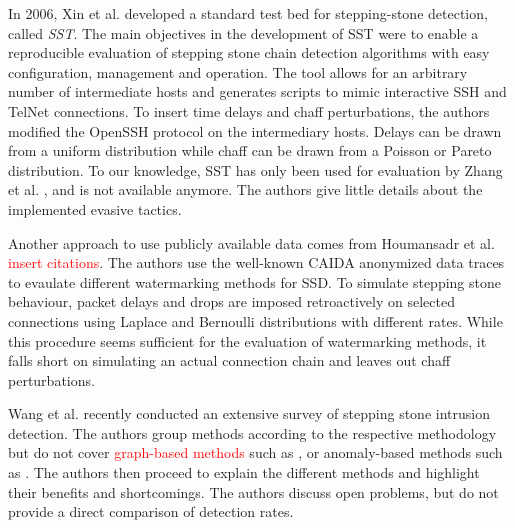 \documentclass[runningheads]{llncs}\usepackage[]{graphicx}\usepackage[]{color}
\begin{document}
In 2006, Xin et al. \cite{xin2006testbed} developed a standard test bed for stepping-stone detection, called \textit{SST}. 
The main objectives in the development of SST were to enable a reproducible evaluation of stepping stone chain detection algorithms with easy configuration, management and operation. The tool allows for an arbitrary number of intermediate hosts and generates scripts to mimic interactive SSH and TelNet connections. 
To insert time delays and chaff perturbations, the authors modified the OpenSSH protocol on the intermediary hosts. Delays can be drawn from a uniform distribution while chaff can be drawn from a Poisson or Pareto distribution. To our knowledge, SST has only been used for evaluation by Zhang et al. \cite{zhang2005stepping}, and is not available anymore. The authors give little details about the implemented evasive tactics.%

Another approach to use publicly available data comes from Houmansadr et al. \textcolor{red}{insert citations}. The authors use the well-known CAIDA anonymized data traces \cite{CAIDA2018} to evaulate different watermarking methods for SSD. To simulate stepping stone behaviour, packet delays and drops are imposed retroactively on selected connections using Laplace and Bernoulli distributions with different rates. While this procedure seems sufficient for the evaluation of watermarking methods, it falls short on simulating an actual connection chain and leaves out chaff perturbations. 


Wang et al. \cite{wang2018research} recently conducted an extensive survey of  stepping stone intrusion detection. The authors group methods according to the respective methodology  
but do not cover \textcolor{red}{graph-based methods} such as \cite{gamarra2018analysis}, %
or anomaly-based methods such as \cite{di2011detecting}.%
The authors then proceed to explain the different methods and highlight their benefits and shortcomings. The authors discuss open problems, but do not provide a direct comparison of detection rates. 
\end{document}
